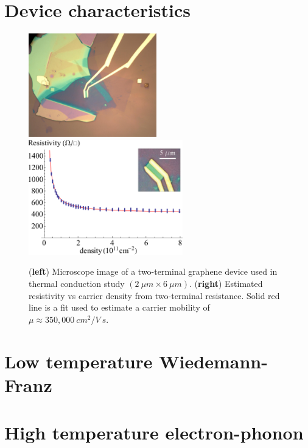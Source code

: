 \section{Device characteristics}
\begin{figure}
\centering
\includegraphics[height=45mm, valign=t]{figures/high_density_graphene/picture_aria.jpg}
\includegraphics[height=50mm, valign=t]{figures/high_density_graphene/mobility.png}
\caption{(\textbf{left}) Microscope image of a two-terminal graphene device used in thermal conduction study $(2~\mu m\times6~\mu m)$. (\textbf{right}) Estimated resistivity vs carrier density from two-terminal resistance. Solid red line is a fit used to estimate a carrier mobility of $\mu\approx 350,000~cm^2/V~s$.
}
\label{fig:Aria}
\end{figure}


\section{Low temperature Wiedemann-Franz}

\section{High temperature electron-phonon}